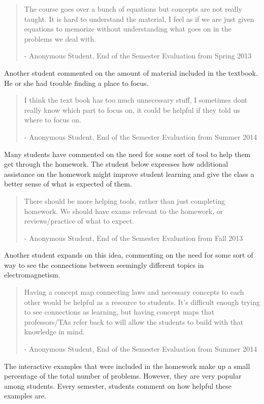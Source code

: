 \begin{quote}
The course goes over a bunch of equations but concepts are not really taught. It is hard to understand the material, I feel as if we are just given equations to memorize without understanding what goes on in the problems we deal with.

- Anonymous Student, End of the Semester Evaluation from Spring 2013
\end{quote}

Another student commented on the amount of material included in the textbook. He or she had trouble finding a place to focus.

\begin{quote}
I think the text book has too much unnecessary stuff, I sometimes dont really know which part to focus on, it could be helpful if they told us where to focus on.

- Anonymous Student, End of the Semester Evaluation from Summer 2014
\end{quote}

Many students have commented on the need for some sort of tool to help them get through the homework. The student below expresses how additional assistance on the homework might improve student learning and give the class a better sense of what is expected of them.

\begin{quote}
There should be more helping tools, rather than just completing homework. We should have exams relevant to the homework, or reviews/practice of what to expect.

- Anonymous Student, End of the Semester Evaluation from Fall 2013
\end{quote}

Another student expands on this idea, commenting on the need for some sort of way to see the connections between seemingly different topics in electromagnetism.

\begin{quote}
Having a concept map connecting laws and necessary concepts to each other would be helpful as a resource to students. It's difficult enough trying to see connections as learning, but having concept maps that professors/TAs refer back to will allow the students to build with that knowledge in mind.

- Anonymous Student, End of the Semester Evaluation from Summer 2014
\end{quote}

The interactive examples that were included in the homework make up a small percentage of the total number of problems. However, they are very popular among students. Every semester, students comment on how helpful these examples are.

